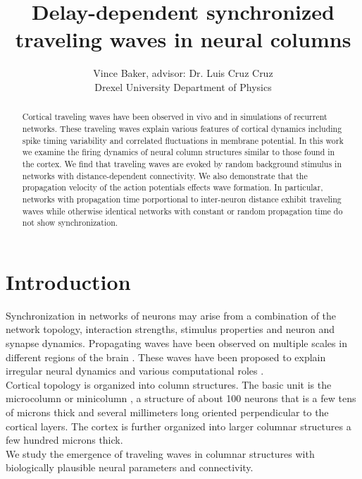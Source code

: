 \documentclass[a4paper,11pt]{article}
\title{Delay-dependent synchronized traveling waves in neural columns}
\author{Vince Baker, advisor: Dr. Luis Cruz Cruz\\ Drexel University Department of Physics}
\begin{document}
\maketitle

\begin{abstract}
Cortical traveling waves have been observed in vivo and in simulations of recurrent networks.
These traveling waves explain various features of cortical dynamics including spike timing variability and correlated fluctuations in membrane potential.
In this work we examine the firing dynamics of neural column structures similar to those found in the cortex.
We find that traveling waves are evoked by random background stimulus in networks with distance-dependent connectivity.
We also demonstrate that the propagation velocity of the action potentials effects wave formation.
In particular, networks with propagation time porportional to inter-neuron distance exhibit traveling waves while otherwise identical networks with constant or random propagation time do not show synchronization.

\end{abstract}

\section{Introduction} 
Synchronization in networks of neurons may arise from a combination of the network topology, interaction strengths, stimulus properties and neuron and synapse dynamics.
Propagating waves have been observed on multiple scales in different regions of the brain \cite{muller2018}.
These waves have been proposed to explain irregular neural dynamics \cite{keane2015} and various computational roles \cite{muller2018}. 
\\
Cortical topology is organized into column structures. 
The basic unit is the microcolumn or minicolumn \cite{cruz2005}, a structure of about 100 neurons that is a few tens of microns thick and several millimeters long oriented perpendicular to the cortical layers.
The cortex is further organized into larger columnar structures a few hundred microns thick. 
\\
We study the emergence of traveling waves in columnar structures with biologically plausible neural parameters and connectivity.
\end{document}
